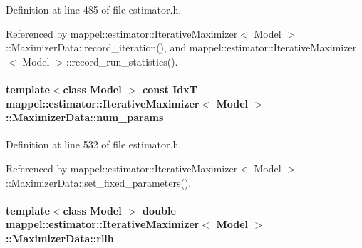 Definition at line 485 of file estimator.\+h.



Referenced by mappel\+::estimator\+::\+Iterative\+Maximizer$<$ Model $>$\+::\+Maximizer\+Data\+::record\+\_\+iteration(), and mappel\+::estimator\+::\+Iterative\+Maximizer$<$ Model $>$\+::record\+\_\+run\+\_\+statistics().

\paragraph[{\texorpdfstring{num\+\_\+params}{num_params}}]{\setlength{\rightskip}{0pt plus 5cm}template$<$class Model $>$ const {\bf IdxT} {\bf mappel\+::estimator\+::\+Iterative\+Maximizer}$<$ Model $>$\+::Maximizer\+Data\+::num\+\_\+params\hspace{0.3cm}{\ttfamily [protected]}}\hypertarget{classmappel_1_1estimator_1_1IterativeMaximizer_1_1MaximizerData_ab4a5825d98602d9f94f3666c2167619d}{}\label{classmappel_1_1estimator_1_1IterativeMaximizer_1_1MaximizerData_ab4a5825d98602d9f94f3666c2167619d}


Definition at line 532 of file estimator.\+h.



Referenced by mappel\+::estimator\+::\+Iterative\+Maximizer$<$ Model $>$\+::\+Maximizer\+Data\+::set\+\_\+fixed\+\_\+parameters().

\paragraph[{\texorpdfstring{rllh}{rllh}}]{\setlength{\rightskip}{0pt plus 5cm}template$<$class Model $>$ double {\bf mappel\+::estimator\+::\+Iterative\+Maximizer}$<$ Model $>$\+::Maximizer\+Data\+::rllh}\hypertarget{classmappel_1_1estimator_1_1IterativeMaximizer_1_1MaximizerData_a8df6de6efff1eab16147e3ab42f98469}{}\label{classmappel_1_1estimator_1_1IterativeMaximizer_1_1MaximizerData_a8df6de6efff1eab16147e3ab42f98469}


